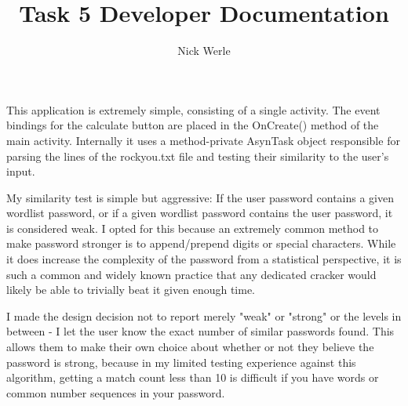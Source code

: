 \documentclass{article}
\title{Task 5 Developer Documentation}
\author{Nick Werle}
\begin{document}
\maketitle
This application is extremely simple, consisting of a single activity. The event bindings for the calculate button are placed in the OnCreate() method of the main activity.
Internally it uses a method-private AsynTask object responsible for parsing the lines of the rockyou.txt file and testing their similarity to the user's input.

My similarity test is simple but aggressive: If the user password contains a given wordlist password, or if a given wordlist password contains the user password, it is considered weak.
I opted for this because an extremely common method to make password stronger is to append/prepend digits or special characters.
While it does increase the complexity of the password from a statistical perspective, it is such a common and widely known practice that any dedicated cracker would likely be able to trivially beat it given enough time.

I made the design decision not to report merely "weak" or "strong" or the levels in between - I let the user know the exact number of similar passwords found. This allows them to make their own choice about whether or not they believe the password is strong, because in my limited testing experience against this algorithm, getting a match count less than 10 is  difficult if you have words or common number sequences in your password.
\end{document}
